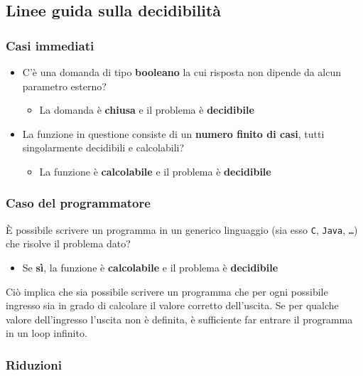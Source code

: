 \documentclass[italian, 10pt]{article}
\begin{document}
\subsection{Linee guida sulla decidibilità}

\subsubsection{Casi immediati}

\begin{itemize}
  \item C'è una domanda di tipo \textbf{booleano} la cui risposta non dipende da alcun parametro esterno?
        \begin{itemize}[label=\(\Rightarrow\)]
          \item La domanda è \textbf{chiusa} e il problema è \textbf{decidibile}
        \end{itemize}
  \item La funzione in questione consiste di un \textbf{numero finito di casi}, tutti singolarmente decidibili e calcolabili?
        \begin{itemize}[label=\(\Rightarrow\)]
          \item La funzione è \textbf{calcolabile} e il problema è \textbf{decidibile}
        \end{itemize}
\end{itemize}

\subsubsection{Caso del programmatore}

È possibile scrivere un programma in un generico linguaggio (sia esso \texttt{C}, \texttt{Java}, \texttt{\ldots}) che risolve il problema dato?

\begin{itemize}[label=\(\Rightarrow\)]
  \item Se \textbf{sì}, la funzione è \textbf{calcolabile} e il problema è \textbf{decidibile}
\end{itemize}

Ciò implica che sia possibile scrivere un programma che per ogni possibile ingresso sia in grado di calcolare il valore corretto dell'uscita.
Se per qualche valore dell'ingresso l'uscita non è definita, è sufficiente far entrare il programma in un loop infinito.

\subsubsection{Riduzioni}
\end{document}
